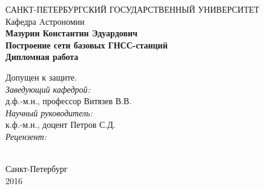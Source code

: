 \documentclass[a4paper,12pt]{report}
\begin{document}
\begin{titlepage}
\begin{center}
{\large САНКТ-ПЕТЕРБУРГСКИЙ ГОСУДАРСТВЕННЫЙ УНИВЕРСИТЕТ \\[6mm] Кафедра Aстрономии }\\
\vspace{2cm}
{\Large \bf Мазурин Константин Эдуардович } \\
\vspace{2cm}
{\LARGE \bf Построение сети базовых ГНСС-станций } \\
\vspace{2cm}
{\large \bf Дипломная работа } \\[12mm]
\end{center}

\begin{flushright}
{ \large Допущен к защите. \\[4mm]
{\it Заведующий кафедрой:} \\
д.ф.-м.н., профессор {\Large Витязев В.В.}\\ [4mm]
{\it Научный руководитель:} \\
к.ф.-м.н., доцент {\Large Петров С.Д.}\\ [4mm]
{\it Рецензент:} \\
\\ }
\end{flushright}
\vspace{5cm}
\begin{center}
{\large Санкт-Петербург \\[5mm] 2016}
\end{center}
\end{titlepage}
\end{document}
